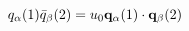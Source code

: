 \begin{equation}                      
q_{\alpha}(1) \bar{q}_{\beta}(2) = u_{0} {\bf q}_{\alpha}(1)                       
\cdot{\bf q}_{\beta}(2)                      
\end{equation} 

